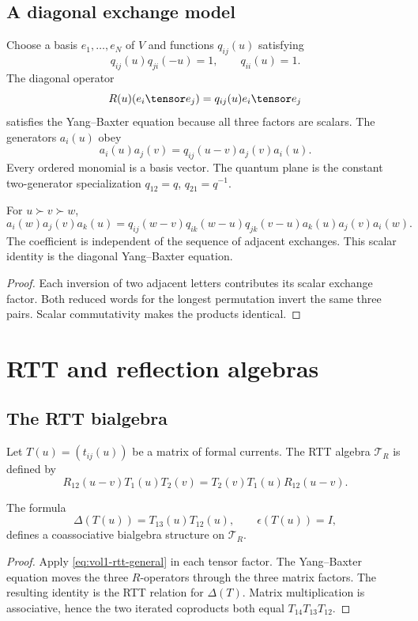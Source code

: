 \section{A diagonal exchange model}
Choose a basis $e_1,\ldots,e_N$ of $V$ and functions $q_{ij}(u)$ satisfying
\[
 q_{ij}(u)q_{ji}(-u)=1,
 \qquad q_{ii}(u)=1.
\]
The diagonal operator
\[
 R(u)(e_i\tensor e_j)=q_{ij}(u)e_i\tensor e_j
\]
satisfies the Yang--Baxter equation because all three factors are scalars.  The generators $a_i(u)$ obey
\[
 a_i(u)a_j(v)=q_{ij}(u-v)a_j(v)a_i(u).
\]
Every ordered monomial is a basis vector.  The quantum plane is the constant two-generator specialization $q_{12}=q$, $q_{21}=q^{-1}$.

\begin{calculation}
For $u\succ v\succ w$,
\[
 a_i(w)a_j(v)a_k(u)
 =q_{ij}(w-v)q_{ik}(w-u)q_{jk}(v-u)
  a_k(u)a_j(v)a_i(w).
\]
The coefficient is independent of the sequence of adjacent exchanges.  This scalar identity is the diagonal Yang--Baxter equation.
\end{calculation}
\begin{proof}
Each inversion of two adjacent letters contributes its scalar exchange factor.  Both reduced words for the longest permutation invert the same three pairs.  Scalar commutativity makes the products identical.
\end{proof}

\chapter{RTT and reflection algebras}
\section{The RTT bialgebra}
Let $T(u)=(t_{ij}(u))$ be a matrix of formal currents.  The RTT algebra $\mathcal T_R$ is defined by
\begin{equation}\label{eq:vol1-rtt-general}
 R_{12}(u-v)T_1(u)T_2(v)
 =T_2(v)T_1(u)R_{12}(u-v).
\end{equation}

\begin{theorem}
The formula
\[
 \Delta(T(u))=T_{13}(u)T_{12}(u),
 \qquad \epsilon(T(u))=I,
\]
defines a coassociative bialgebra structure on $\mathcal T_R$.
\end{theorem}
\begin{proof}
Apply \eqref{eq:vol1-rtt-general} in each tensor factor.  The Yang--Baxter equation moves the three $R$-operators through the three matrix factors.  The resulting identity is the RTT relation for $\Delta(T)$.  Matrix multiplication is associative, hence the two iterated coproducts both equal $T_{14}T_{13}T_{12}$.
\end{proof}

